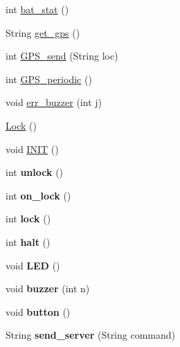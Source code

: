 \begin{DoxyCompactItemize}
\item 
int \hyperlink{classLock_a5fc531d02f2e50a29b1c97302f3f460e}{bat\+\_\+stat} ()
\item 
String \hyperlink{classLock_a0519d89f2078d4ba0856ac86c013750b}{get\+\_\+gps} ()
\item 
int \hyperlink{classLock_afec116577c070054eceddb79e9cba5b5}{G\+P\+S\+\_\+send} (String loc)
\item 
int \hyperlink{classLock_a7be8cde31732205468890971be6dec37}{G\+P\+S\+\_\+periodic} ()
\item 
void \hyperlink{classLock_a8a3e6986ea1ca319a0bc65e8e7c948cd}{err\+\_\+buzzer} (int j)
\item 
\hyperlink{classLock_a9944623567d8138b95e74fadc7190adb}{Lock} ()
\item 
void \hyperlink{classLock_a4c2e4681b8c0554513336d4d8a2b5ae0}{I\+N\+IT} ()
\item 
int {\bfseries unlock} ()\hypertarget{classLock_a3ddbac8fd0d1c72745ed66e541c602c7}{}\label{classLock_a3ddbac8fd0d1c72745ed66e541c602c7}

\item 
int {\bfseries on\+\_\+lock} ()\hypertarget{classLock_a1f17ec767fefe3e6119d58791613d535}{}\label{classLock_a1f17ec767fefe3e6119d58791613d535}

\item 
int {\bfseries lock} ()\hypertarget{classLock_adc2fc021ff79cd4c47292257d5ae4994}{}\label{classLock_adc2fc021ff79cd4c47292257d5ae4994}

\item 
int {\bfseries halt} ()\hypertarget{classLock_ac8d63185b00be8be043eb514329419d1}{}\label{classLock_ac8d63185b00be8be043eb514329419d1}

\item 
void {\bfseries L\+ED} ()\hypertarget{classLock_aabf72af9ea6e8e0f66170c1cd1a20a71}{}\label{classLock_aabf72af9ea6e8e0f66170c1cd1a20a71}

\item 
void {\bfseries buzzer} (int n)\hypertarget{classLock_ac4b44d2889106f98e0ffacbc708867ad}{}\label{classLock_ac4b44d2889106f98e0ffacbc708867ad}

\item 
void {\bfseries button} ()\hypertarget{classLock_a05170f58d6268b5d35a238d67ff4f64a}{}\label{classLock_a05170f58d6268b5d35a238d67ff4f64a}

\item 
String {\bfseries send\+\_\+server} (String command)\hypertarget{classLock_a9eec8ba8bcc9cb29180d84bdfe269737}{}\label{classLock_a9eec8ba8bcc9cb29180d84bdfe269737}


\end{DoxyCompactItemize}
